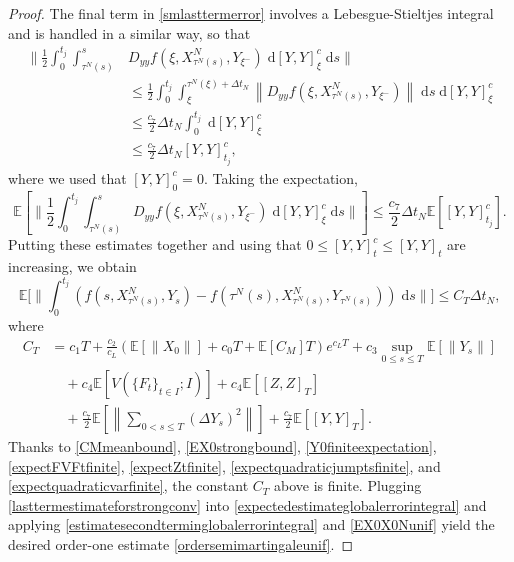\documentclass[reqno,12pt]{amsart}
\theoremstyle{plain} %
\theoremstyle{definition} %
\begin{document}
\begin{proof}
    The final term in \eqref{smlasttermerror} involves a Lebesgue-Stieltjes integral and is handled in a similar way, so that
    \begin{align*}
        \bigg\|\frac{1}{2} \int_0^{t_j} \int_{\tau^N(s)}^s & D_{yy}f(\xi, X_{\tau^N(s)}^N, Y_{\xi^-})\;\mathrm{d}[Y, Y]_\xi^c\;\mathrm{d}s \bigg\| \\
        & \leq \frac{1}{2} \int_0^{t_j} \int_{\xi}^{\tau^N(\xi) + \Delta t_N} \left\|D_{yy}f(\xi, X_{\tau^N(s)}^N, Y_{\xi^-})\right\|\;\mathrm{d}s\;\mathrm{d}[Y, Y]_\xi^c \\
        & \leq \frac{c_7}{2}\Delta t_N\int_0^{t_j} \;\mathrm{d}[Y, Y]_\xi^c \\ 
        & \leq \frac{c_7}{2}\Delta t_N [Y, Y]_{t_j}^c,
    \end{align*}
    where we used that $[Y, Y]_0^c = 0.$ Taking the expectation,
    \[
        \mathbb{E}\left[\bigg\|\frac{1}{2} \int_0^{t_j} \int_{\tau^N(s)}^s D_{yy}f(\xi, X_{\tau^N(s)}^N, Y_{\xi^-})\;\mathrm{d}[Y, Y]_\xi^c\;\mathrm{d}s \bigg\|\right] \leq \frac{c_7}{2}\Delta t_N \mathbb{E}\left[[Y, Y]_{t_j}^c\right].
    \]
    Putting these estimates together and using that $0 \leq [Y, Y]_t^c \leq [Y, Y]_t$ are increasing, we obtain
    \begin{equation}
        \label{lasttermestimateforstrongconv}
        \mathbb{E}\bigg[\bigg\| \int_0^{t_j} \left( f(s, X_{\tau^N(s)}^N, Y_s) - f(\tau^N(s), X_{\tau^N(s)}^N, Y_{\tau^N(s)}) \right)\;\mathrm{d}s \bigg\|\bigg] \leq C_T \Delta t_N,
    \end{equation}
    where
    \begin{equation*}
        \begin{aligned}
            C_T & = c_1 T + \frac{c_2}{c_L} \left(\mathbb{E}\left[\|X_0\|\right] + c_0 T + \mathbb{E}[C_M] T \right) e^{c_L T} + c_3\sup_{0 \leq s \leq T}\mathbb{E}\left[\|Y_s\|\right] \\
            & \quad + c_4\mathbb{E}\left[ V(\{F_t\}_{t\in I}; I) \right] + c_4\mathbb{E}\left[ [Z, Z]_T\right] \\
            & \quad + \frac{c_7}{2} \mathbb{E}\left[\left\|\sum_{0 < s \leq T}\left( \Delta Y_s \right)^2\right\|\right] + \frac{c_7}{2} \mathbb{E}\left[[Y, Y]_T\right].
        \end{aligned}
    \end{equation*}
    Thanks to \eqref{CMmeanbound}, \eqref{EX0strongbound}, \eqref{Y0finiteexpectation}, \eqref{expectFVFtfinite}, \eqref{expectZtfinite}, \eqref{expectquadraticjumptsfinite}, and \eqref{expectquadraticvarfinite}, the constant $C_T$ above is finite. Plugging \eqref{lasttermestimateforstrongconv} into \eqref{expectedestimateglobalerrorintegral} and applying \eqref{estimatesecondterminglobalerrorintegral} and \eqref{EX0X0Nunif} yield the desired order-one estimate \eqref{ordersemimartingaleunif}.
\end{proof}
\end{document}

